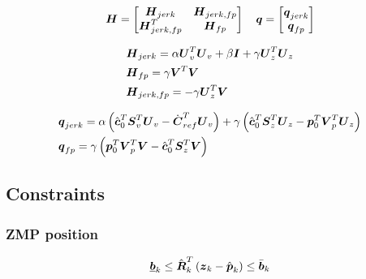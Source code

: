 \begin{equation*}
\M{H} = 
    \begin{bmatrix}
        \M{H}_{jerk}        &   \M{H}_{jerk,fp}\\
        \M{H}_{jerk,fp}^T   &   \M{H}_{fp}
    \end{bmatrix}
\quad
\V{q} = 
    \begin{bmatrix}
        \V{q}_{jerk}\\
        \V{q}_{fp}
    \end{bmatrix}
\end{equation*}

\begin{equation*}
\begin{split}
& \M{H}_{jerk} = 
    \alpha \M{U}_v^T \M{U}_v 
    + \beta \M{I}
    + \gamma \M{U}_z^T \M{U}_z\\
& \M{H}_{fp} = 
    \gamma \M{V}^T \M{V}\\
& \M{H}_{jerk,fp} = 
    - \gamma \M{U}_z^T \M{V}
\end{split}
\end{equation*}


\begin{equation*}
\begin{split}
& \V{q}_{jerk} = 
    \alpha 
    \left(
        \cstate_0^T \M{S}_v^T \M{U}_v
        -
        \cVel_{ref}^T \M{U}_v 
    \right)
    + 
    \gamma 
    \left(
        \cstate_0^T \M{S}_z^T \M{U}_z
        - 
        \fp_0^T \M{V}_p^T \M{U}_z 
    \right)\\
& \V{q}_{fp} =
    \gamma 
    \left(
        \fp_0^T \M{V}_p^T \M{V}
        - 
        \cstate_0^T \M{S}_z^T \M{V}
    \right)
\end{split}
\end{equation*}


\subsection{Constraints}

\subsubsection{ZMP position}
\begin{equation*}
    \underline{\V{b}}_k \le \hat{\M{R}}_k^T \left( \zmp_k - \fph_k \right) \le \bar{\V{b}}_k\\
\end{equation*}

